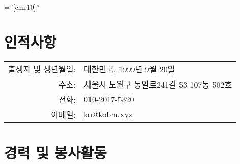\documentclass[a4paper]{article} %
\begin{document}
\pagestyle{empty} %

\font\fb=''[cmr10]'' %


\par{\bigskip\par} %

\section{인적사항}

\begin{tabular}{rl}
\textsc{출생지 및 생년월일:} & 대한민국, 1999년 9월 20일 \\
\textsc{주소:} & 서울시 노원구 동일로241길
53 107동 502호 \\
\textsc{전화:} & 010-2017-5320\\
\textsc{이메일:} & \href{mailto:ko@kobm.xyz}{ko@kobm.xyz}
\end{tabular}


\section{경력 및 봉사활동}
\end{document}
